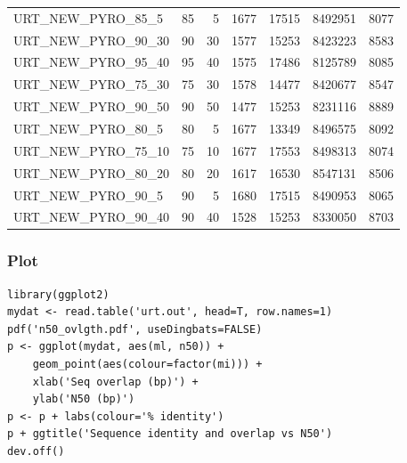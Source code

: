 \documentclass[a4paper, twoside]{article}
\begin{document}
\begin{center}
\begin{tabular}{lrrrrrr}
URT\_NEW\_PYRO\_85\_5 & 85 & 5 & 1677 & 17515 & 8492951 & 8077\\
URT\_NEW\_PYRO\_90\_30 & 90 & 30 & 1577 & 15253 & 8423223 & 8583\\
URT\_NEW\_PYRO\_95\_40 & 95 & 40 & 1575 & 17486 & 8125789 & 8085\\
URT\_NEW\_PYRO\_75\_30 & 75 & 30 & 1578 & 14477 & 8420677 & 8547\\
URT\_NEW\_PYRO\_90\_50 & 90 & 50 & 1477 & 15253 & 8231116 & 8889\\
URT\_NEW\_PYRO\_80\_5 & 80 & 5 & 1677 & 13349 & 8496575 & 8092\\
URT\_NEW\_PYRO\_75\_10 & 75 & 10 & 1677 & 17553 & 8498313 & 8074\\
URT\_NEW\_PYRO\_80\_20 & 80 & 20 & 1617 & 16530 & 8547131 & 8506\\
URT\_NEW\_PYRO\_90\_5 & 90 & 5 & 1680 & 17515 & 8490953 & 8065\\
URT\_NEW\_PYRO\_90\_40 & 90 & 40 & 1528 & 15253 & 8330050 & 8703\\
\hline
\end{tabular}
\end{center}
\subsubsection{Plot}
\label{sec:orgc3bed55}
\begin{verbatim}
library(ggplot2)
mydat <- read.table('urt.out', head=T, row.names=1)
pdf('n50_ovlgth.pdf', useDingbats=FALSE)
p <- ggplot(mydat, aes(ml, n50)) +
    geom_point(aes(colour=factor(mi))) +
    xlab('Seq overlap (bp)') +
    ylab('N50 (bp)')
p <- p + labs(colour='% identity')
p + ggtitle('Sequence identity and overlap vs N50')
dev.off()
\end{verbatim}
\end{document}
